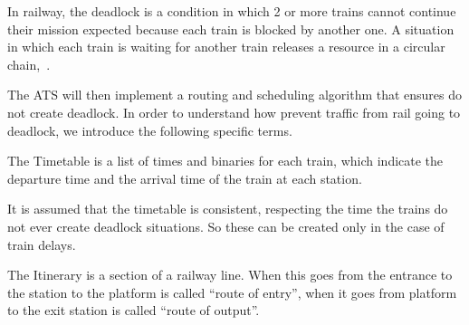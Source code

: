 \documentclass{ewic}
\begin{document}
In railway, the deadlock is a condition in which 2 or more trains cannot  continue their mission expected because each train is blocked by another one.
A situation in which each train is waiting for another train releases a resource in a circular chain,~\cite{Pachl2012}.



The ATS will then implement a routing and scheduling algorithm that ensures do not create deadlock. In order to understand how prevent traffic from rail going to deadlock, we introduce the following specific terms.


The Timetable is a list of times and binaries for each train, which indicate the departure time and the arrival time of the train at each station.

It is assumed that the timetable is consistent, respecting the time the trains do not ever create deadlock situations. So these can be created only in the case of train delays.


The Itinerary is a section of a railway line. When this goes from the entrance to the station to the platform is called ``route of entry'', when it goes from platform to the exit station is called ``route of output''.

\end{document}

